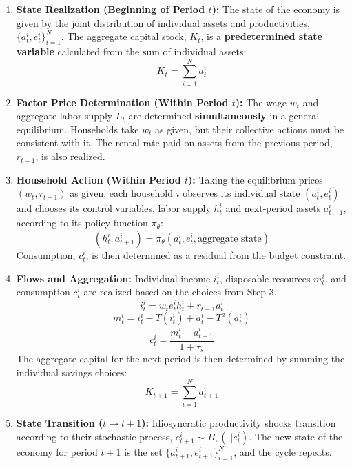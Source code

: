 \documentclass[11pt]{article}
\begin{document}
\begin{enumerate}
    \item \textbf{State Realization (Beginning of Period $t$):}
    The state of the economy is given by the joint distribution of individual assets and productivities, $\{a_t^i, e_t^i\}_{i=1}^N$. The aggregate capital stock, $K_t$, is a \textbf{predetermined state variable} calculated from the sum of individual assets:
    $$
    K_t = \sum_{i=1}^{N} a_t^i
    $$

    \item \textbf{Factor Price Determination (Within Period $t$):}
    The wage $w_t$ and aggregate labor supply $L_t$ are determined \textbf{simultaneously} in a general equilibrium. Households take $w_t$ as given, but their collective actions must be consistent with it. The rental rate paid on assets from the previous period, $r_{t-1}$, is also realized.

    \item \textbf{Household Action (Within Period $t$):}
    Taking the equilibrium prices $(w_t, r_{t-1})$ as given, each household $i$ observes its individual state $(a_t^i, e_t^i)$ and chooses its control variables, labor supply $h_t^i$ and next-period assets $a_{t+1}^i$, according to its policy function $\pi_\theta$:
    $$
    (h_t^i, a_{t+1}^i) = \pi_\theta(a_t^i, e_t^i, \text{aggregate state})
    $$
    Consumption, $c_t^i$, is then determined as a residual from the budget constraint.

    \item \textbf{Flows and Aggregation:}
    Individual income $i_t^i$, disposable resources $m_t^i$, and consumption $c_t^i$ are realized based on the choices from Step 3.
    $$
    i_t^i = w_t e_t^i h_t^i + r_{t-1} a_t^i
    $$
    $$
    m_t^i = i_t^i - T(i_t^i) + a_t^i - T^{a}(a_t^i)
    $$
    $$
    c_t^i = \frac{m_t^i - a_{t+1}^i}{1+\tau_s}
    $$
    The aggregate capital for the next period is then determined by summing the individual savings choices:
    $$
    K_{t+1} = \sum_{i=1}^{N} a_{t+1}^i
    $$

    \item \textbf{State Transition ($t \to t+1$):}
    Idiosyncratic productivity shocks transition according to their stochastic process, $e_{t+1}^i \sim \Pi_e(\cdot | e_t^i)$. The new state of the economy for period $t+1$ is the set $\{a_{t+1}^i, e_{t+1}^i\}_{i=1}^N$, and the cycle repeats.
\end{enumerate}
\end{document}
